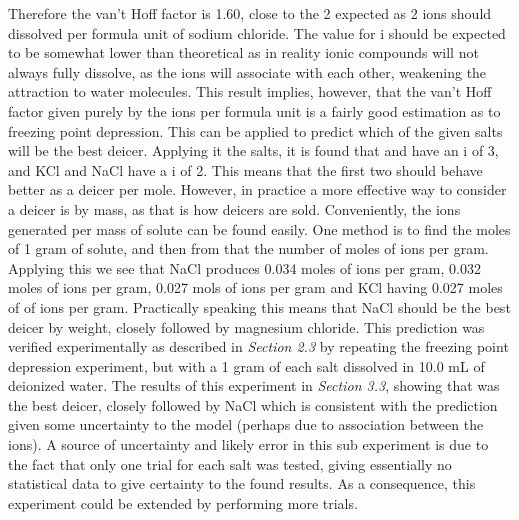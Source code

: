 \documentclass[12pt, letterpaper]{article}
\begin{document}
Therefore the van't Hoff factor is 1.60, close to the 2 expected as 2 ions should dissolved per formula unit of sodium chloride. The value for i should be expected to be somewhat lower than theoretical as in reality ionic compounds will not always fully dissolve, as the ions will associate with each other, weakening the attraction to water molecules. This result implies, however, that the van't Hoff factor given purely by the ions per formula unit is a fairly good estimation as to freezing point depression. This can be applied to predict which of the given salts will be the best deicer. Applying it the salts, it is found that  and  have an i of 3, and KCl and NaCl have a i of 2. This means that the first two should behave better as a deicer per mole. However, in practice a more effective way to consider a deicer is by mass, as that is how deicers are sold. Conveniently, the ions generated per mass of solute can be found easily. One method is to find the moles of 1 gram of solute, and then from that the number of moles of ions per gram. Applying this we see that NaCl produces 0.034 moles of ions per gram,  0.032 moles of ions per gram,  0.027 mols of ions per gram and KCl having 0.027 moles of of ions per gram. Practically speaking this means that NaCl should be the best deicer by weight, closely followed by magnesium chloride. This prediction was verified experimentally as described in \textit{Section 2.3} by repeating the freezing point depression experiment, but with a 1 gram of each salt dissolved in 10.0 mL of deionized water. The results of this experiment in  \textit{Section 3.3}, showing that  was the best deicer, closely followed by NaCl which is consistent with the prediction given some uncertainty to the model (perhaps due to association between the ions).  A source of uncertainty and likely error in this sub experiment is due to the fact that only one trial for each salt was tested, giving essentially no statistical data to give certainty to the found results. As a consequence, this experiment could be extended by performing more trials.\\\par
\end{document}
